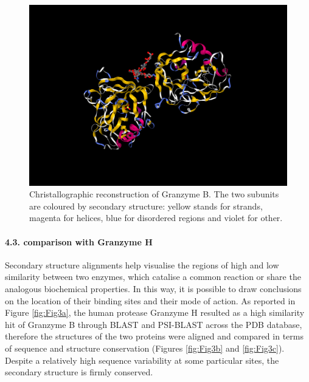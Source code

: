 \documentclass[
]{article}
\begin{document}
\begin{figure}

{\centering \includegraphics[width=0.8\linewidth]{secondary structure visualisation/1fq3_structure} 

}

\caption{Christallographic reconstruction of Granzyme B. The two subunits are coloured by secondary structure: yellow stands for strands, magenta for helices, blue for disordered regions and violet for other.}\label{fig:Fig2c}
\end{figure}

\hypertarget{comparison-with-granzyme-h}{%
\paragraph{4.3. comparison with Granzyme H}\label{comparison-with-granzyme-h}}

Secondary structure alignments help visualise the regions of high and low similarity between two enzymes, which catalise a common reaction or share the analogous biochemical properties. In this way, it is possible to draw conclusions on the location of their binding sites and their mode of action. As reported in Figure \ref{fig:Fig3a}, the human protease Granzyme H resulted as a high similarity hit of Granzyme B through BLAST and PSI-BLAST across the PDB database, therefore the structures of the two proteins were aligned and compared in terms of sequence and structure conservation (Figures \ref{fig:Fig3b} and \ref{fig:Fig3c}). Despite a relatively high sequence variability at some particular sites, the secondary structure is firmly conserved.
\end{document}
